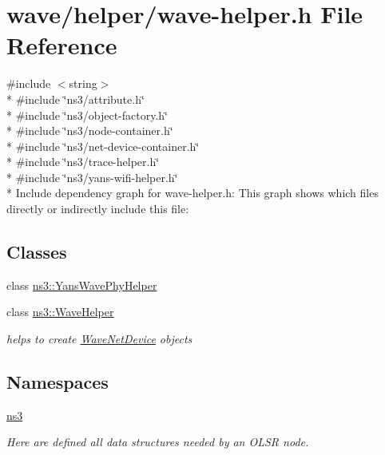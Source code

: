\hypertarget{wave-helper_8h}{}\section{wave/helper/wave-\/helper.h File Reference}
\label{wave-helper_8h}
{\ttfamily \#include $<$string$>$}\\*
{\ttfamily \#include \char`\"{}ns3/attribute.\+h\char`\"{}}\\*
{\ttfamily \#include \char`\"{}ns3/object-\/factory.\+h\char`\"{}}\\*
{\ttfamily \#include \char`\"{}ns3/node-\/container.\+h\char`\"{}}\\*
{\ttfamily \#include \char`\"{}ns3/net-\/device-\/container.\+h\char`\"{}}\\*
{\ttfamily \#include \char`\"{}ns3/trace-\/helper.\+h\char`\"{}}\\*
{\ttfamily \#include \char`\"{}ns3/yans-\/wifi-\/helper.\+h\char`\"{}}\\*
Include dependency graph for wave-\/helper.h\+:
This graph shows which files directly or indirectly include this file\+:
\subsection*{Classes}
\begin{DoxyCompactItemize}
\item 
class \hyperlink{classns3_1_1YansWavePhyHelper}{ns3\+::\+Yans\+Wave\+Phy\+Helper}
\item 
class \hyperlink{classns3_1_1WaveHelper}{ns3\+::\+Wave\+Helper}
\begin{DoxyCompactList}\small\item\em helps to create \hyperlink{classns3_1_1WaveNetDevice}{Wave\+Net\+Device} objects \end{DoxyCompactList}\end{DoxyCompactItemize}
\subsection*{Namespaces}
\begin{DoxyCompactItemize}
\item 
 \hyperlink{namespacens3}{ns3}
\begin{DoxyCompactList}\small\item\em Here are defined all data structures needed by an O\+L\+SR node. \end{DoxyCompactList}\end{DoxyCompactItemize}
